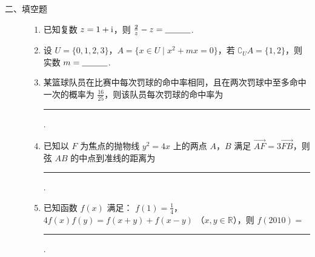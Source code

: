\begin{description}

    \item[二、填空题]

    \begin{enumerate}[leftmargin=5pt]

      \addtocounter{enumi}{+10}

        \item 已知复数 \(z = 1 + \mathrm{i}\)，则 \(\frac{2}{z} - z =\rule[-0.3ex]{3em}{0.4pt}\).

        \item 设 \(U = \{0, 1, 2, 3\}\)，\(A = \{x \in U \mid x^2 + mx = 0\}\)，若 \(\complement_U A = \{1, 2\}\)，则实数 \(m =\rule[-0.3ex]{3em}{0.4pt}\).

        \item 某篮球队员在比赛中每次罚球的命中率相同，且在两次罚球中至多命中一次的概率为 \(\frac{16}{25}\)，则该队员每次罚球的命中率为\rule[-0.3ex]{3em}{0.4pt}.

        \item 已知以 \(F\) 为焦点的抛物线 \(y^{2} = 4x\) 上的两点 \(A\)，\(B\) 满足 \(\overrightarrow{AF} = 3\overrightarrow{FB}\)，则弦 \(AB\) 的中点到准线的距离为\rule[-0.3ex]{3em}{0.4pt}.

        \item 已知函数 \( f(x) \) 满足： \(f(1) = \frac{1}{4}\)，\(4f(x)f(y) = f(x + y) + f(x - y)\) （\(x, y \in \mathbb{R}\)），则 \( f(2010) = \)\rule[-0.3ex]{3em}{0.4pt}.

    \end{enumerate}

\end{description}


